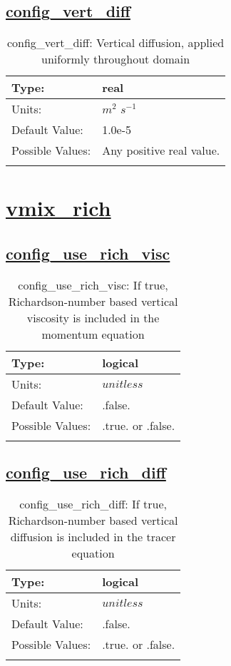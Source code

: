 \subsection[config\_vert\_diff]{\hyperref[sec:nm_tab_vmix_const]{config\_vert\_diff}}
\label{subsec:nm_sec_config_vert_diff}
\begin{center}
\begin{longtable}{| p{2.0in} || p{4.0in} |}
    \hline
    Type: & real \\
    \hline
    Units: & $m^2$ $s^{-1}$ \\
    \hline
    Default Value: & 1.0e-5 \\
    \hline
    Possible Values: & Any positive real value. \\
    \hline
    \caption{config\_vert\_diff: Vertical diffusion, applied uniformly throughout domain}
\end{longtable}
\end{center}
\section[vmix\_rich]{\hyperref[sec:nm_tab_vmix_rich]{vmix\_rich}}
\label{sec:nm_sec_vmix_rich}
\subsection[config\_use\_rich\_visc]{\hyperref[sec:nm_tab_vmix_rich]{config\_use\_rich\_visc}}
\label{subsec:nm_sec_config_use_rich_visc}
\begin{center}
\begin{longtable}{| p{2.0in} || p{4.0in} |}
    \hline
    Type: & logical \\
    \hline
    Units: & $unitless$ \\
    \hline
    Default Value: & .false. \\
    \hline
    Possible Values: & .true. or .false. \\
    \hline
    \caption{config\_use\_rich\_visc: If true, Richardson-number based vertical viscosity is included in the momentum equation}
\end{longtable}
\end{center}
\subsection[config\_use\_rich\_diff]{\hyperref[sec:nm_tab_vmix_rich]{config\_use\_rich\_diff}}
\label{subsec:nm_sec_config_use_rich_diff}
\begin{center}
\begin{longtable}{| p{2.0in} || p{4.0in} |}
    \hline
    Type: & logical \\
    \hline
    Units: & $unitless$ \\
    \hline
    Default Value: & .false. \\
    \hline
    Possible Values: & .true. or .false. \\
    \hline
    \caption{config\_use\_rich\_diff: If true, Richardson-number based vertical diffusion is included in the tracer equation}
\end{longtable}
\end{center}
